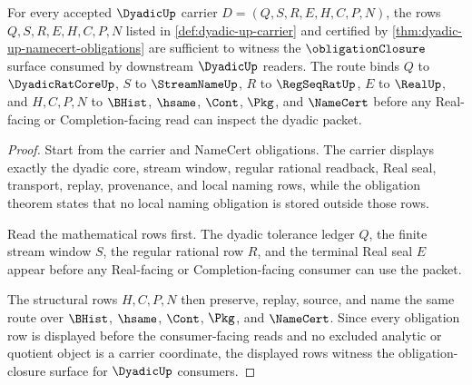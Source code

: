 \begin{theorem}
\label{thm:dyadic-up-obligation-closure-route}
For every accepted $\DyadicUp$ carrier $D=(Q,S,R,E,H,C,P,N)$, the rows $Q,S,R,E,H,C,P,N$ listed in \autoref{def:dyadic-up-carrier} and certified by \autoref{thm:dyadic-up-namecert-obligations} are sufficient to witness the $\obligationClosure$ surface consumed by downstream $\DyadicUp$ readers. The route binds $Q$ to $\DyadicRatCoreUp$, $S$ to $\StreamNameUp$, $R$ to $\RegSeqRatUp$, $E$ to $\RealUp$, and $H,C,P,N$ to $\BHist$, $\hsame$, $\Cont$, $\Pkg$, and $\NameCert$ before any Real-facing or Completion-facing read can inspect the dyadic packet.
\end{theorem}
\begin{proof}
Start from the carrier and NameCert obligations. The carrier displays exactly the dyadic core, stream window, regular rational readback, Real seal, transport, replay, provenance, and local naming rows, while the obligation theorem states that no local naming obligation is stored outside those rows.

Read the mathematical rows first. The dyadic tolerance ledger $Q$, the finite stream window $S$, the regular rational row $R$, and the terminal Real seal $E$ appear before any Real-facing or Completion-facing consumer can use the packet.

The structural rows $H,C,P,N$ then preserve, replay, source, and name the same route over $\BHist$, $\hsame$, $\Cont$, $\Pkg$, and $\NameCert$. Since every obligation row is displayed before the consumer-facing reads and no excluded analytic or quotient object is a carrier coordinate, the displayed rows witness the obligation-closure surface for $\DyadicUp$ consumers.
\end{proof}


